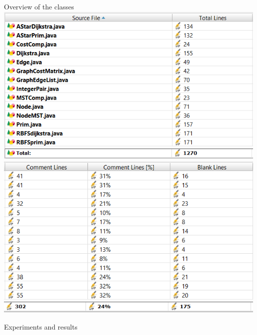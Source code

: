 \documentclass[12pt, a4paper]{article}
\begin{document}
\newpage
\centering
\large
Overview of the classes
\vspace{20mm}
\includegraphics{Image1.PNG}
\vspace{20mm}
\includegraphics{Image2.PNG}

\newpage
\vspace{10mm}
\centering
\large 
Experiments and results
\end{document}
